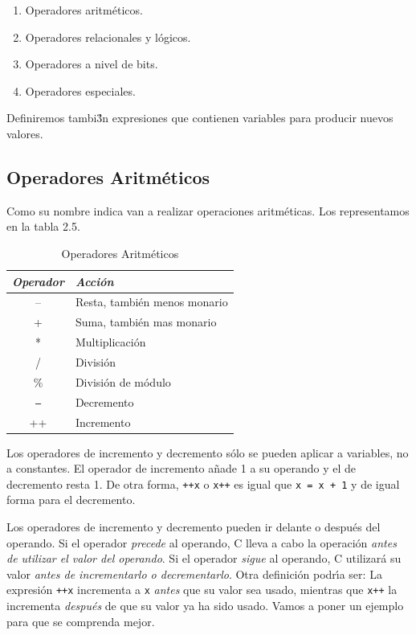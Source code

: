 \begin{enumerate}

\item Operadores aritm\'eticos.
\item Operadores relacionales y l\'ogicos.
\item Operadores a nivel de bits.
\item Operadores especiales.

\end{enumerate}

Definiremos tambi\'3n expresiones que contienen variables para producir 
nuevos valores.

\subsection{Operadores Aritm\'eticos}


Como su nombre indica van a realizar operaciones aritm\'eticas. Los 
representamos en la tabla 2.5.

\begin{table}[!hbp]
\begin{tabular}{|c|l|}
\hline
\em Operador & \em Acci\'on\\\hline
\hline
-- & Resta, tambi\'en menos monario\\\hline
+ & Suma, tambi\'en mas monario\\\hline
* & Multiplicaci\'on\\\hline
/ & Divisi\'on\\\hline
\% & Divisi\'on de m\'odulo\\\hline
\texttt{--} & Decremento\\\hline
++ & Incremento\\\hline

\end{tabular}
\caption{Operadores Aritm\'eticos}
\end{table}


Los operadores de incremento y decremento s\'olo se pueden aplicar a variables,
no a constantes. El operador de incremento a\~nade 1 a su operando y el de
decremento resta 1. De otra forma, \texttt{++x} o \texttt{x++} es igual que
\texttt{x = x + 1} y de igual forma para el decremento.

Los operadores de incremento y decremento pueden ir delante o despu\'es del
operando. Si el operador \emph{precede} al operando, C lleva a cabo la 
operaci\'on \emph{antes de utilizar el valor del operando}. Si el operador
\emph{sigue} al operando, C utilizar\'a su valor \emph{antes de incrementarlo
o decrementarlo}. Otra definici\'on podr\'{\i}a ser: La expresi\'on 
\texttt{++x} incrementa a \texttt{x} \emph{antes} que su valor sea usado, 
mientras que \texttt{x++} la incrementa \emph{despu\'es} de que su valor ya
ha sido usado. Vamos a poner un ejemplo para que se comprenda mejor.

